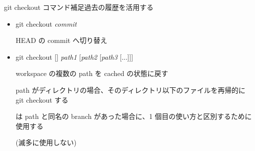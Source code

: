 \begin{frame}[t]{git checkout コマンド補足}{過去の履歴を活用する}

  \begin{itemize}
  \item git checkout \textit{commit}

    HEAD の commit へ切り替え

    \vspace{2ex}

  \item git checkout [{\dhyphen}]  \textit{path1} [\textit{path2} [\textit{path3} [...]]]

    workspace の複数の path を cached の状態に戻す

    \vspace{2ex}

    path がディレクトリの場合、そのディレクトリ以下のファイルを再帰的に git checkout する

    \vspace{2ex}

    {\dhyphen} は path と同名の branch があった場合に、1 個目の使い方と区別するために使用する

    (滅多に使用しない)
  \end{itemize}

\end{frame}
